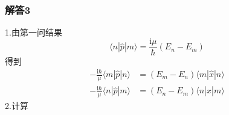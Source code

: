 \subsubsection{解答3}
1.由第一问结果
\begin{equation}
    \langle n|\hat{p}|m\rangle =\frac{\mathrm{i}\mu}{\hbar}\left( E_n-E_m \right) 
\end{equation}
得到
\begin{equation}
    \begin{aligned}
        -\frac{\mathrm{i}\hbar}{\mu}\langle m|\hat{p}|n\rangle &=\left( E_m-E_n \right) \langle m|\hat{x}|n\rangle 
\\
-\frac{\mathrm{i}\hbar}{\mu}\langle n|\hat{p}|m\rangle &=\left( E_n-E_m \right) \langle n|\hat{x}|m\rangle 
    \end{aligned}
\end{equation}
2.计算
